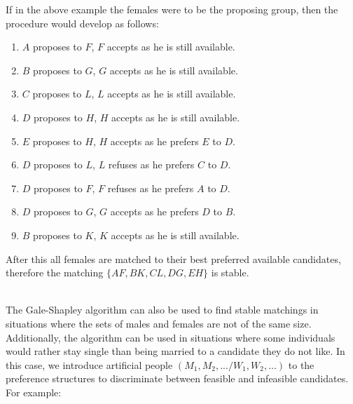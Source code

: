 \documentclass[12pt]{article}
\begin{document}
\newpage
\noindent
If in the above example the females were to be the proposing group, then the procedure would develop as follows:

\begin{enumerate}
    \item $A$ proposes to $F$, $F$ accepts as he is still available.
    \item $B$ proposes to $G$, $G$ accepts as he is still available.
    \item $C$ proposes to $L$, $L$ accepts as he is still available.
    \item $D$ proposes to $H$, $H$ accepts as he is still available.
    \item $E$ proposes to $H$, $H$ accepts as he prefers $E$ to $D$.
    \item $D$ proposes to $L$, $L$ refuses as he prefers $C$ to $D$.
    \item $D$ proposes to $F$, $F$ refuses as he prefers $A$ to $D$.
    \item $D$ proposes to $G$, $G$ accepts as he prefers $D$ to $B$.
    \item $B$ proposes to $K$, $K$ accepts as he is still available.
\end{enumerate}

\noindent
After this all females are matched to their best preferred available candidates, therefore the matching $\{ AF, BK, CL, DG, EH \}$ is stable.

\noindent
\\
The Gale-Shapley algorithm can also be used to find stable matchings in situations where the sets of males and females are not of the same size.
Additionally, the algorithm can be used in situations where some individuals would rather stay single than being married to a candidate they do not like.
In this case, we introduce artificial people $(M_1, M_2, ... / W_1, W_2, ...)$ to the preference structures to discriminate between feasible and infeasible candidates.
For example:
\end{document}
